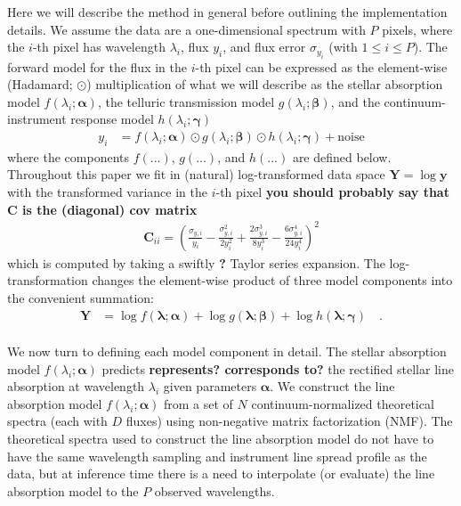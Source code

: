 \documentclass[modern]{aastex631}
\renewcommand{\vec}[1]{\mathbf{#1}}
\newcommand{\vecalpha}{\boldsymbol{\alpha}}
\newcommand{\vecbeta}{\boldsymbol{\beta}}
\newcommand{\vecgamma}{\boldsymbol{\gamma}}
\newcommand{\hadamard}{\odot}
\newcommand{\ajw}[1]{\textbf{#1}}
\begin{document}

Here we will describe the method in general before outlining the implementation details. We assume the data are a one-dimensional spectrum with $P$ pixels, where the $i$-th pixel has wavelength $\lambda_i$, flux $y_i$, and flux error $\sigma_{y_i}$ (with $1 \leq i \leq P$). The forward model for the flux in the $i$-th pixel can be expressed as the element-wise (Hadamard; $\hadamard$) multiplication of what we will describe as the stellar absorption model $f(\lambda_i; \vecalpha)$, the telluric transmission model $g(\lambda_i; \vecbeta)$, and the continuum-instrument response model $h(\lambda_i;\vecgamma)$
\begin{align}\label{eq:y}
    y_i &= f(\lambda_i;\vecalpha)\hadamard{}g(\lambda_i;\vecbeta)\hadamard{}h(\lambda_i;\vecgamma) + \mbox{noise}
\end{align}
where the components $f(...)$, $g(...)$, and $h(...)$ are defined below. Throughout this paper we fit in (natural) log-transformed data space $\vec{Y} = \log{\vec{y}}$ with the transformed variance in the $i$-th pixel
\ajw{you should probably say that C is the (diagonal) cov matrix}
\begin{eqnarray}
    \vec{C}_{ii} = \left(\frac{\sigma_{y,i}}{y_i} - \frac{\sigma_{y,i}^2}{2y_i^2} + \frac{2\sigma_{y,i}^3}{8y_i^3} - \frac{6\sigma_{y,i}^4}{24y_i^4}\right)^2
\end{eqnarray}
\noindent{}which is computed by taking a swiftly \ajw{?} Taylor series expansion. The log-transformation changes the element-wise product of three model components into the convenient summation:
\begin{align}
    \label{eq:log_y}
    \vec{Y} &= \log{f(\vec{\lambda}; \vecalpha)} + \log{g(\vec{\lambda};\vecbeta)} + \log{h(\vec{\lambda};\vecgamma)} \quad .
\end{align}\\

We now turn to defining each model component in detail.
The stellar absorption model $f(\lambda_i;\vecalpha)$ predicts \ajw{represents? corresponds to?} the rectified stellar line absorption at wavelength $\lambda_i$ given parameters $\vecalpha$. We construct the line absorption model $f(\lambda_i;\vecalpha)$ from a set of $N$ continuum-normalized theoretical spectra (each with $D$ fluxes) using non-negative matrix factorization (NMF).
The theoretical spectra used to construct the line absorption model do not have to have the same wavelength sampling and instrument line spread profile as the data, but at inference time there is a need to interpolate (or evaluate) the line absorption model to the $P$ observed wavelengths.\\
\end{document}
